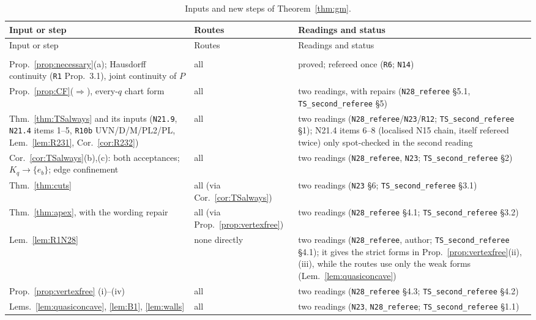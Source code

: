 \documentclass[11pt]{article}
\theoremstyle{definition}
\theoremstyle{remark}
\newcommand{\src}[1]{\texttt{#1}}
\begin{document}
{\small
\begin{longtable}{>{\raggedright\arraybackslash}p{5.2cm}>{\raggedright\arraybackslash}p{2.2cm}>{\raggedright\arraybackslash}p{6.7cm}}
\caption{Inputs and new steps of Theorem~\ref{thm:gm}.}\label{tab:gmdeps}\\
\toprule
Input or step & Routes & Readings and status\\
\midrule
\endfirsthead
\toprule
Input or step & Routes & Readings and status\\
\midrule
\endhead
\multicolumn{3}{l}{\emph{Imported inputs}}\\
Prop.~\ref{prop:necessary}(a); Hausdorff continuity (\src{R1} Prop.~3.1), joint continuity of $P$ & all & proved; refereed once (\src{R6}; \src{N14})\\
Prop.~\ref{prop:CF}($\Rightarrow$), every-$q$ chart form & all & two readings, with repairs (\src{N28\_referee} \S5.1, \src{TS\_second\_referee} \S5)\\
Thm.~\ref{thm:TSalways} and its inputs (\src{N21.9}, \src{N21.4} items 1--5, \src{R10b} UVN/D/M/PL2/PL, Lem.~\ref{lem:R231}, Cor.~\ref{cor:R232}) & all & two readings (\src{N28\_referee}/\src{N23}/\src{R12}; \src{TS\_second\_referee} \S1); N21.4 items 6--8 (localised N15 chain, itself refereed twice) only spot-checked in the second reading\\
Cor.~\ref{cor:TSalways}(b),(c): both acceptances; $K_q\to\{e_b\}$; edge confinement & all & two readings (\src{N28\_referee}, \src{N23}; \src{TS\_second\_referee} \S2)\\
Thm.~\ref{thm:cuts} & all (via Cor.~\ref{cor:TSalways}) & two readings (\src{N23} \S6; \src{TS\_second\_referee} \S3.1)\\
Thm.~\ref{thm:apex}, with the wording repair & all (via Prop.~\ref{prop:vertexfree}) & two readings (\src{N28\_referee} \S4.1; \src{TS\_second\_referee} \S3.2)\\
Lem.~\ref{lem:R1N28} & none directly & two readings (\src{N28\_referee}, author; \src{TS\_second\_referee} \S4.1); it gives the strict forms in Prop.~\ref{prop:vertexfree}(ii),(iii), while the routes use only the weak forms (Lem.~\ref{lem:quasiconcave})\\
Prop.~\ref{prop:vertexfree} (i)--(iv) & all & two readings (\src{N28\_referee} \S4.3; \src{TS\_second\_referee} \S4.2)\\
Lems.~\ref{lem:quasiconcave}, \ref{lem:B1}, \ref{lem:walls} & all & two readings (\src{N23}, \src{N28\_referee}; \src{TS\_second\_referee} \S1.1)\\

\end{longtable}}
\end{document}

